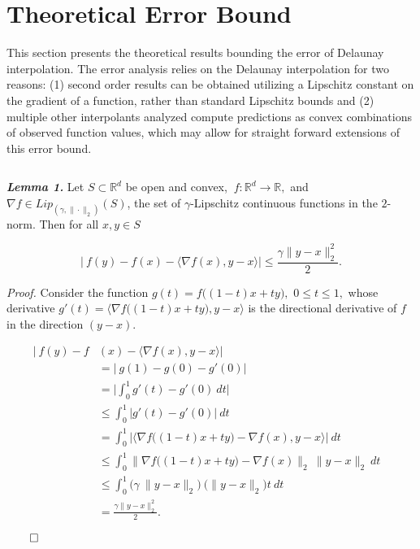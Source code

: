 \documentclass[sigconf]{acmart}
\begin{document}
\section{Theoretical Error Bound}

This section presents the theoretical results bounding the error of Delaunay interpolation. The error analysis relies on the Delaunay interpolation for two reasons: (1) second order results can be obtained utilizing a Lipschitz constant on the gradient of a function, rather than standard Lipschitz bounds and (2) multiple other interpolants analyzed compute predictions as convex combinations of observed function values, which may allow for straight forward extensions of this error bound.

$ $

\noindent \textbf{\textit{Lemma 1.}} Let $S \subset \mathbb{R}^d$ be open and convex, $\ f: \mathbb{R}^d \rightarrow \mathbb{R},$ and $\nabla f \in Lip_{(\gamma,\|\cdot\|_2)}(S)$, the set of $\gamma$-Lipschitz continuous functions in the $2$-norm. Then for all $x,y \in S$

$$\big|\ f(y) - f(x) - \langle \nabla f(x), y - x \rangle \big| \leq \frac{\gamma \|y - x\|_2^2}{2}.$$

\noindent \textit{Proof.} Consider the function $g(t) = f \big((1-t) x + t y \big),$ $0 \leq t \leq 1,$ whose derivative $g'(t) = \big\langle \nabla f \big((1-t) x + t y \big), y - x \big\rangle$ is the directional derivative of $f$ in the direction $(y - x).$

\begin{align*}
  \big|\ f(y) - f&(x) - \langle \nabla f(x), y - x \rangle \big| &\\ 
     &= \big|\ g(1) - g(0) - g'(0) \big| & \\
     &= \bigg| \int_0^1 g'(t) - g'(0)\ dt \bigg| \\
     &\leq \int_0^1 \big|g'(t) - g'(0)\big|\ dt \\
     &= \int_0^1 \bigg| \big \langle \nabla f\big((1-t)x + ty\big) - \nabla f(x), y - x \big \rangle \bigg|\ dt \\
     &\leq \int_0^1 \big \| \nabla f\big((1-t)x + ty\big) - \nabla f(x) \big \|_2\ \| y - x \|_2\ dt \\
     &\leq \int_0^1 \big ( \gamma\ \|y-x\|_2 \big) \ \big( \|y-x\|_2 \big) t\ dt \\
     &= \frac{\gamma \|y - x\|_2^2}{2}.
\end{align*}

$\qed$
\end{document}
